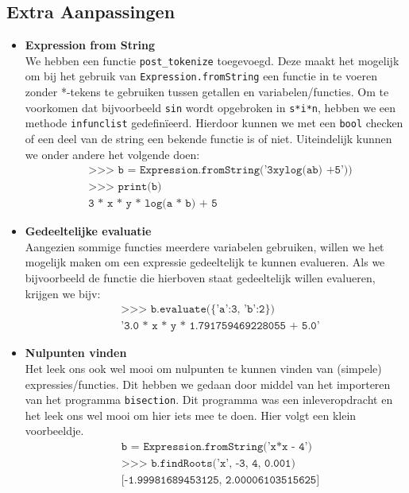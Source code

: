 \documentclass[12pt]{article}
\begin{document}
\subsection*{Extra Aanpassingen}
\begin{itemize}
\item \textbf{Expression from String}\\
We hebben een functie \texttt{post\_tokenize} toegevoegd. Deze maakt het mogelijk om bij het gebruik van \texttt{Expression.fromString} een functie in te voeren zonder *-tekens te gebruiken tussen getallen en variabelen/functies. Om te voorkomen dat bijvoorbeeld \texttt{sin} wordt opgebroken in \texttt{s*i*n}, hebben we een methode \texttt{infunclist} gedefin\"{i}eerd. Hierdoor kunnen we met een \texttt{bool} checken of een deel van de string een bekende functie is of niet. Uiteindelijk kunnen we onder andere het volgende doen:
\begin{align*}
&\texttt{>>> b = Expression.fromString('3xylog(ab) +5'))}\\
&\texttt{>>> print(b)}\\
&\texttt{3 * x * y * log(a * b) + 5}
\end{align*}

\item \textbf{Gedeeltelijke evaluatie}\\
Aangezien sommige functies meerdere variabelen gebruiken, willen we het mogelijk maken om een expressie gedeeltelijk te kunnen evalueren. Als we bijvoorbeeld de functie die hierboven staat gedeeltelijk willen evalueren, krijgen we bijv:
\begin{align*}
&\texttt{>>> b.evaluate(\{'a':3, 'b':2\})}\\
&\texttt{'3.0 * x * y * 1.791759469228055 + 5.0'}
\end{align*}

\item \textbf{Nulpunten vinden}\\
Het leek ons ook wel mooi om nulpunten te kunnen vinden van (simpele) expressies/functies. Dit hebben we gedaan door middel van het importeren van het programma \texttt{bisection}. Dit programma was een inleveropdracht en het leek ons wel mooi om hier iets mee te doen. Hier volgt een klein voorbeeldje.
\begin{align*}
&\texttt{b = Expression.fromString('x*x - 4')}\\
&\texttt{>>> b.findRoots('x', -3, 4, 0.001)}\\
&\texttt{[-1.99981689453125, 2.00006103515625]}
\end{align*}


\end{itemize}
\end{document}
